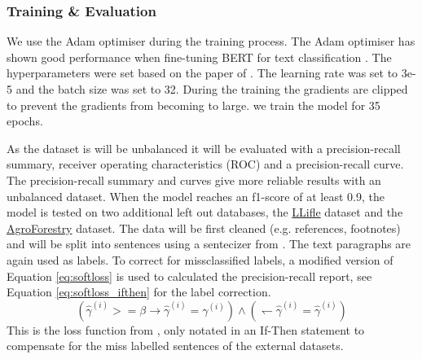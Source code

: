 \documentclass[a4paper, 12pt, oneside]{book} %
\begin{document}
\subsubsection{Training \& Evaluation}
We use the Adam optimiser \autocite{kingma_adam_2017} during the training process.
The Adam optimiser has shown good performance when fine-tuning BERT for text classification \autocite{you_large_2020}.
The hyperparameters were set based on the paper of \textcite{sun_how_2020}.
The learning rate was set to 3e-5 and the batch size was set to 32.
During the training the gradients are clipped to prevent the gradients from becoming to large.
we train the model for 35 epochs.

As the dataset is will be unbalanced it will be evaluated with a precision-recall summary, receiver operating characteristics (ROC) and a precision-recall curve.
The precision-recall summary and curves give more reliable results with an unbalanced dataset.
When the model reaches an f1-score of at least 0.9, the model is tested on two additional left out databases, the \href{http://www.llifle.com/}{LLifle} dataset and the \href{https://www.worldagroforestry.org/}{AgroForestry} dataset.
The data will be first cleaned (e.g. references, footnotes) and will be split into sentences using a sentecizer from \textcite{honnibal_spacy_2020}.
The text paragraphs are again used as labels. 
To correct for missclassified labels, a modified version of Equation \ref{eq:softloss} is used to calculated the precision-recall report, see Equation \ref{eq:softloss_ifthen} for the label correction.
\begin{equation} \label{eq:softloss_ifthen}
(\hat{\gamma}^{(i)} >= \beta \rightarrow \hat{\gamma}^{(i)} = \gamma^{(i)}) \wedge ( \leftharpoondown \hat{\gamma}^{(i)} = \hat{\gamma}^{(i)})
\end{equation}
This is the loss function from \textcite{reed_training_2015}, only notated in an If-Then statement to compensate for the miss labelled sentences of the external datasets.
\end{document}
